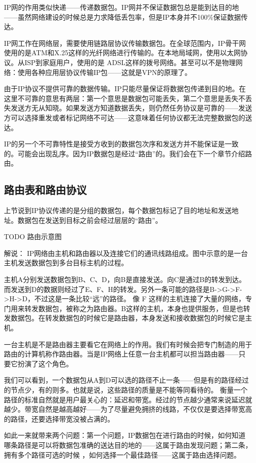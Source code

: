 IP网的作用类似快递——传递数据包。IP网并不保证数据包总是能到达目的地——虽然网络建设的时候总是力求降低丢包率，但是IP本身并不100\%保证数据传达。

IP网工作在网络层，需要使用链路层协议传输数据包。在全球范围内，IP骨干网使用的是ATM和X.25这样的光纤网络进行传输的。在本地局域网，使用以太网协议。从ISP到家庭用户，使用的是
ADSL这样的拨号网络。甚至可以不是物理网络：使用各种应用层协议传输IP包——这就是VPN的原理了。

由于IP协议不提供可靠的数据传输。IP只能尽量保证将数据包传递到目的地。在这里不可靠的意思有两层：第一个意思是数据包可能丢失，第二个意思是丢失不丢失发送方无从知晓。如果发送方知道数据丢失，则仍然任务协议是可靠的——发送方可以选择重发或者标记网络不可达——这意味着任何协议都无法完整数据包的送达。

IP的另一个不可靠特性是接受方收到的数据包次序和发送方并不能保证是一致的。可能会出现乱序。因为IP数据包是经过“路由”的。我们会在下一个章节介绍路由。

\subsection{路由表和路由协议}

上节说到IP协议传递的是分组的数据包，每个数据包标记了目的地址和发送地址。数据包在发送到目标之前会经过层层的“路由”。

TODO 路由示意图

解说： IP网络由主机和路由器以及连接它们的通讯线路组成。图中示意的是一台主机发送数据包到多台目标主机的过程。

主机A分别发送数据包到B、C、D，向B是直接发送。向C是通过B的转发到达。而发送到D的数据则经过了E、F、H的转发。另外一条可能的路径是B->G->F->H->D，不过这是一条比较“远”的路径。
像 F 这样的主机连接了大量的网络，专门用来转发数据包，被称之为路由器。B这样的主机，本身也提供服务，但是也转发数据包。在转发数据包的时候它是路由器，本身发送和接收数据包的时候它是主机。

一台主机是不是路由器主要看它在网络上的作用。我们有时候会把专门制造的用于路由的计算机称作路由器。当是IP网络上任意一台主机都可以担当路由器——只要它扮演了这个角色。

我们可以看到，一个数据包从A到D可以选的路径不止一条——但是有的路径经过的节点少，有的则多。也就是说，这些路径的质量是不能等同看待的。
衡量一个路径的标准自然就是用户最关心的：延迟和带宽。经过的节点越少通常来说延迟就越少。带宽自然是越高越好——为了尽量避免拥挤的线路，不仅仅是要选择带宽高的路径，还要选择带宽没被占满的。

如此一来就带来两个问题：第一个问题，IP数据包在进行路由的时候，如何知道哪条路径是可以将数据包准确的送达目的地的——这属于路由发现问题；第二条，拥有多个路径可选的时候 ，如何选择一个最佳路径——这属于路由选择问题。

